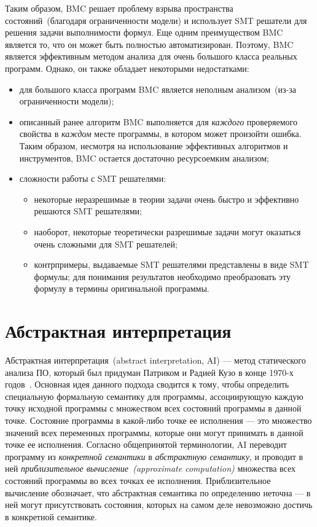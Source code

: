 Таким образом, BMC решает проблему взрыва пространства состояний~(благодаря 
ограниченности модели) и использует SMT решатели для решения задачи 
выполнимости формул. Еще одним преимуществом BMC является то, что он может быть
полностью автоматизирован. Поэтому, BMC является эффективным методом анализа для 
очень большого класса реальных программ. Однако, он также обладает некоторыми 
недостатками:
\begin{itemize}
\item для большого класса программ BMC является неполным анализом~(из-за 
ограниченности модели);

\item описанный ранее алгоритм BMC выполняется для \emph{каждого} 
проверяемого свойства в \emph{каждом} месте программы, в котором может 
произойти ошибка. Таким образом, несмотря на использование эффективных 
алгоритмов и инструментов, BMC остается достаточно ресурсоемким анализом;

\item сложности работы с SMT решателями:
	\begin{itemize}
	\item некоторые неразрешимые в теории задачи очень быстро и эффективно 
	решаются SMT решателями;
	\item наоборот, некоторые теоретически разрешимые задачи могут оказаться
	очень сложными для SMT решателей;
	\item контрпримеры, выдаваемые SMT решателями представлены в виде 
	SMT формулы; для понимания результатов необходимо преобразовать эту формулу
	в термины оригинальной программы.
	\end{itemize}
\end{itemize}

\section{Абстрактная интерпретация}
Абстрактная интерпретация~(abstract interpretation, AI) --- метод 
статического анализа ПО, который был придуман Патриком и Радией Кузо в конце 
1970-х годов~\cite{ai}. Основная идея данного подхода сводится к тому, чтобы 
определить специальную формальную семантику для программы, ассоциирующую 
каждую точку исходной программы с множеством всех состояний программы в данной 
точке. Состояние программы в какой-либо точке ее исполнения --- это множество 
значений всех переменных программы, которые они могут принимать в данной точке 
ее исполнения. Согласно общепринятой терминологии, AI переводит программу из 
\emph{конкретной семантики} в \emph{абстрактную семантику}, и проводит в ней 
\emph{приблизительное вычисление~(approximate computation)} множества всех
состояний программы во всех точках ее исполнения. Приблизительное вычисление 
обозначает, что абстрактная семантика по определению неточна --- в ней могут 
присутствовать состояния, которых на самом деле невозможно достичь в 
конкретной семантике.

